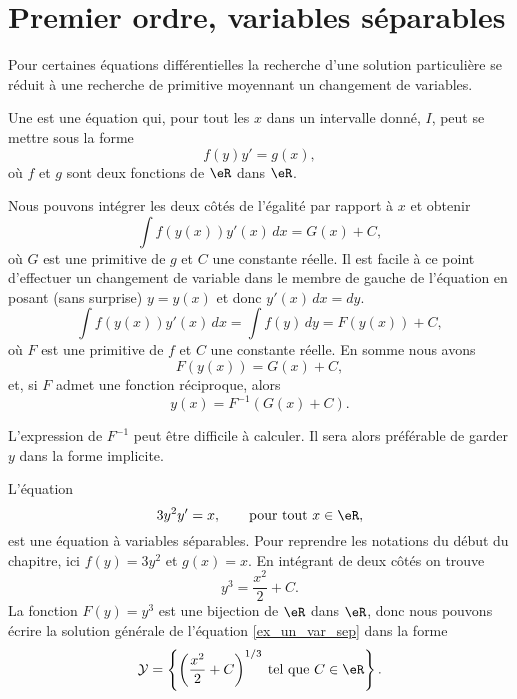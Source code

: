 \section{Premier ordre, variables séparables}

Pour certaines équations différentielles la recherche d'une solution particulière se réduit à une recherche de primitive moyennant un changement de variables.
\begin{definition}
	Une   est une équation qui, pour tout les \(x\) dans un intervalle donné, \(I\), peut se mettre sous la forme
	\begin{equation}\label{eq_var_sep}
		f(y)y' = g(x),
	\end{equation}
	o\`u \(f\) et \(g\) sont deux fonctions de \(\eR\) dans \(\eR\).
\end{definition}
Nous pouvons intégrer les deux côtés de l'égalité par rapport à \(x\) et obtenir
\[
	\int f(y(x))y'(x)\, dx = G(x)+C,
\]
o\`u \( G\) est une primitive de \( g\) et \( C\) une constante réelle. Il est facile \`a ce point d'effectuer un changement de variable dans le membre de gauche de l'équation en posant (sans surprise) \(y= y(x)\) et donc \(y'(x)\,dx = dy\).
\[
	\int f(y(x))y'(x)\, dx =  \int f(y)\, dy  = F(y(x)) + C ,
\]
o\`u \( F\) est une primitive de \( f\) et \( C\) une constante réelle. En somme nous avons
\[
	F(y(x)) = G(x) + C ,
\]
et, si \( F\) admet une fonction réciproque, alors
\begin{equation}
	y(x) = F^{-1} (G(x)+C).
\end{equation}
\begin{remark}
	L'expression de \( F^{-1} \) peut être difficile à calculer. Il sera alors préférable de garder \( y\) dans la forme implicite.
\end{remark}

\begin{example}
	L'équation
	\begin{equation}\label{ex_un_var_sep}
		3y^2 y' = x, \qquad\text{pour tout } x\in\eR,
	\end{equation}
	est une équation à variables séparables. Pour reprendre les notations du début du chapitre, ici \(f(y) = 3y^2\) et \(g(x) = x\). En intégrant de deux côtés on trouve
	\[
		y^3 = \frac{x^2}{2} + C .
	\]
	La fonction \( F(y) = y^3\) est une bijection de \( \eR\) dans \( \eR\), donc nous pouvons écrire la solution générale de l'équation \eqref{ex_un_var_sep} dans la forme
	\[
		\mathcal{Y} =\left\{ \left(\frac{x^2}{2} + C \right)^{1/3} \:\text{tel que } C\in\eR\right\}.
	\]
\end{example}

